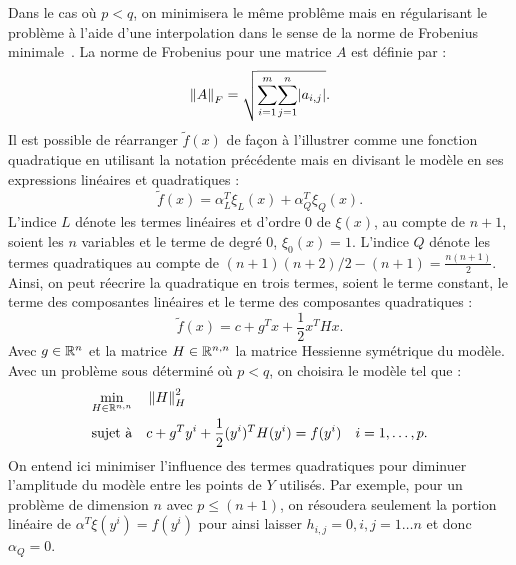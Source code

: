 Dans le cas où $p<q$, on minimisera le même problême mais en régularisant le problème à l'aide d'une interpolation dans le sense de la norme de Frobenius minimale~\cite{MoWi2009,CuRoVi10}. La norme de Frobenius pour une matrice $A$ est définie par : 
\begin{equation*}
\left\lVert A\right\rVert_F = \sqrt{\overset{m}{\underset{i=1}{\sum}} \overset{n}{\underset{j=1}{\sum}}|a_{i,j}|}.
\end{equation*}
Il est possible de réarranger $\tilde{f}(x)$ de façon à l'illustrer comme une fonction quadratique en utilisant la notation précédente mais en divisant le modèle en ses expressions linéaires et quadratiques : 
\begin{equation*}
\tilde{f}(x) = \alpha_{L}^{T}\xi_L(x) + \alpha_{Q}^{T}\xi_Q(x).
\end{equation*}
L'indice $L$ dénote les termes linéaires et d'ordre 0 de $\xi(x)$, au compte de $n+1$, soient les $n$ variables et le terme de degré 0, $\xi_0(x)=1$. L'indice $Q$ dénote les termes quadratiques au compte de $(n+1)(n+2)/2 - (n+1) = \frac{n(n+1)}{2}$. Ainsi, on peut réecrire la quadratique en trois termes, soient le terme constant, le terme des composantes linéaires et le terme des composantes quadratiques : 
\begin{equation*}
\tilde{f}(x) = c + g^T x + \frac{1}{2} x^T H x.
\end{equation*}
Avec $g \in \mathbb{R}^n$ et la matrice $H\in \mathbb{R}^{n,n}$ la matrice Hessienne symétrique du modèle. Avec un problème sous déterminé où $p<q$, on choisira le modèle tel que :
\begin{align*}
&\underset{H \in \mathbb{R}^{n,n}}{\text{min}}& &\left\lVert H\right\rVert^2_H & &\\
&\text{sujet à} & &c + g^T y^i + \frac{1}{2} (y^i)^T H (y^i) = f(y^i) & &i = 1,\dots, p.
\end{align*}
On entend ici minimiser l'influence des termes quadratiques pour diminuer l'amplitude du modèle entre les points de $Y$ utilisés. Par exemple, pour un problème de dimension $n$ avec $p\leq(n+1)$, on résoudera seulement la portion linéaire de $\alpha ^T \xi(y^i) = f(y^i)$ pour ainsi laisser $h_{i,j}=0, i,j=1\dots n$ et donc $\alpha_{Q}=0$.